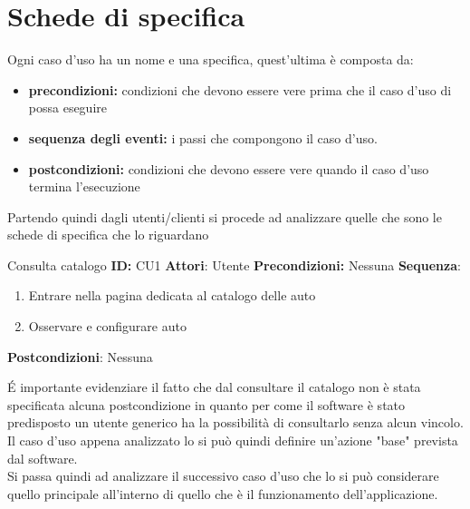 \documentclass[a4paper, 11pt,oneside,]{book}
\newcommand{\spacing}{\par\bigskip\noindent}
\begin{document}
    \section{Schede di specifica}
        Ogni caso d'uso ha un nome e una specifica, quest'ultima è composta da:
        \begin{itemize}
            \item \textbf{precondizioni:} condizioni che devono essere vere prima che il caso d'uso di possa eseguire
            \item \textbf{sequenza degli eventi:} i passi che compongono il caso d'uso.
            \item \textbf{postcondizioni:} condizioni che devono essere vere quando il caso d'uso termina l'esecuzione
        \end{itemize}
        Partendo quindi dagli utenti/clienti si procede ad analizzare quelle che sono le schede di specifica che lo riguardano
        \begin{mybox}{Consulta catalogo}
           \textbf{ID:} CU1
           \tcbline
           \textbf{Attori}: Utente
           \tcbline
           \textbf{Precondizioni:} Nessuna
           \tcbline
           \textbf{Sequenza}: 
           \begin{enumerate}
            \item Entrare nella pagina dedicata al catalogo delle auto
            \item Osservare e configurare auto
           \end{enumerate}
           \tcbline
           \textbf{Postcondizioni}: Nessuna
        \end{mybox}
        \spacing
        \'E importante evidenziare il fatto che dal consultare il catalogo non è stata specificata alcuna postcondizione in quanto per come il software è stato
        predisposto un utente generico ha la possibilità di consultarlo senza alcun vincolo. Il caso d'uso appena analizzato lo si può quindi definire un'azione "base"
        prevista dal software.\\
        Si passa quindi ad analizzare il successivo caso d'uso che lo si può considerare quello principale all'interno di quello che è il funzionamento dell'applicazione.
\end{document}
